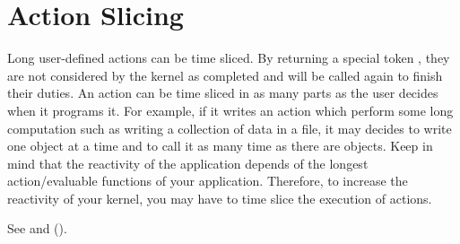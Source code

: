 \section{Action Slicing}

Long user-defined actions can be time sliced. By returning a special token
, they are not considered by the kernel as completed and will be
called again to finish their duties. An action can be time sliced in as many
parts as the user decides when it programs it. For example, if it writes an
action which perform some long computation such as writing a collection of data
in a file, it may decides to write one object at a time and to call it as many
time as there are objects. Keep in mind that the reactivity of the application
depends of the longest action/evaluable functions of your application.
Therefore, to increase the reactivity of your kernel, you may have to time
slice the execution of actions.

See  and  ().

